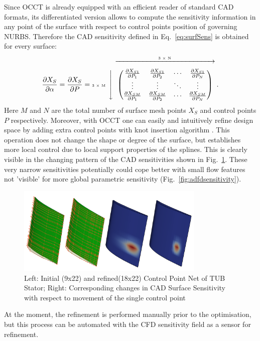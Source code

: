 \documentclass[9pt,academicons]{article}
\begin{document}

Since OCCT is already equipped with an efficient reader of standard CAD formats, its differentiated version allows to compute the sensitivity information in any point of the surface with respect to control points position of governing NURBS. Therefore the CAD sensitivity defined in Eq.~\ref{eq:surfSens} is obtained for every surface:
\vspace{-1em} 
\newcommand{\mymatrix}[1]{\ensuremath{\left\downarrow\vphantom{#1}\right.\overset{\xrightarrow[\hphantom{#1}]{\text{\tiny{3 $\times$ N}}}}{#1}}}
\begin{equation}
\label{eq:nurbsSens}
\frac{\partial X_S}{\partial \alpha} =  
\frac{\partial X_S}{\partial P} =  
\text{\tiny{3 $\times$ M} }\mymatrix{\begin{pmatrix}
  \frac{\partial X_{S1}}{\partial P_1} & \frac{\partial X_{S1}}{\partial P_2} & \cdots & \frac{\partial X_{S1}}{\partial P_N} \\
       \vdots  & \vdots  & \ddots & \vdots  \\
         \frac{\partial X_{SM}}{\partial P_1} & \frac{\partial X_{SM}}{\partial P_2} & \cdots & \frac{\partial X_{SM}}{\partial P_N} 
        \end{pmatrix}} \:.
\end{equation}
Here $M$ and $N$ are the total number of surface mesh points $X_S$ and control points $P$ respectively. Moreover, with OCCT one can easily and intuitively refine design space by adding extra control points with knot insertion algorithm \cite{piegl2012nurbs}. This operation does not change the shape or degree of the surface, but establishes more local control due to local support properties of the splines. This is clearly visible in the changing pattern of the CAD sensitivities shown in Fig.~\ref{fig:knotted}. These very narrow sensitivities potentially could cope better with small flow features not 'visible' for more global parametric sensitivity (Fig.~\ref{fig:adfdsensitivity}).  
\begin{figure}[!h]
\begin{center}
\includegraphics[width=0.8\textwidth]{img/knottedx12_paraviewSensPoled.pdf}
\caption{Left: Initial (9x22) and refined(18x22) Control Point Net of TUB Stator; Right: Corresponding changes in CAD Surface Sensitivity with respect to movement of the single control point}
\label{fig:knotted}
\end{center}
\end{figure}
At the moment, the refinement is performed manually prior to the optimisation, but this process can be automated with the CFD sensitivity field as a sensor for refinement.
\end{document}
